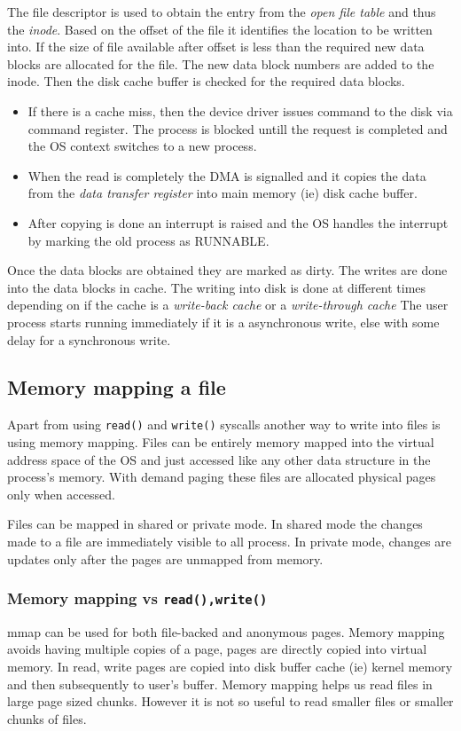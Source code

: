 \documentclass[12pt]{article}
\begin{document}
The file descriptor is used to obtain the entry from the \textit{open file table} and thus the \textit{inode}. Based on the offset of the file it identifies the location to be written into. If the size of file available after offset is less than the required
new data blocks are allocated for the file. The new data block numbers are added to the inode.  
Then the disk cache buffer is checked for the required data blocks. 
\begin{itemize}[itemsep = 0cm, topsep = 0cm, parsep = 0cm]
    \item If there is a cache miss, then the device driver issues command to the disk via command register. The process is blocked untill the request is completed and the OS context switches to a new process. 
    \item When the read is completely the DMA is signalled and it copies the data from the \textit{data transfer register} into main memory (ie) disk cache buffer. 
    \item After copying is done an interrupt is raised and the OS handles the interrupt by marking the old process as RUNNABLE.   
\end{itemize}
Once the data blocks are obtained they are marked as dirty. The writes are done into the data blocks in cache. The writing into disk is done at different times depending on if the cache is a \textit{write-back cache} {or a} \textit{write-through cache}
The user process starts running immediately if it is a asynchronous write, else with some delay for a synchronous write. 


\subsection{Memory mapping a file}
Apart from using \texttt{read()} and \texttt{write()} syscalls another way to write into files is using memory mapping. Files can be entirely memory mapped into the 
virtual address space of the OS and just accessed like any other data structure in the process's memory. With demand paging these files are allocated physical pages only when accessed. 

Files can be mapped in shared or private mode. In shared mode the changes made to a file are immediately visible to all process. In private mode, changes are updates only after the pages are unmapped from memory. 

\subsubsection{Memory mapping vs \texttt{read(),write()}}
mmap can be used for both file-backed and anonymous pages. Memory mapping avoids having multiple copies of a page, pages are directly copied into virtual memory. In read, write pages are copied into disk buffer cache (ie) kernel memory and then subsequently to user's buffer. 
Memory mapping helps us read files in large page sized chunks. However it is not so useful to read smaller files or smaller chunks of files. 
\end{document}
